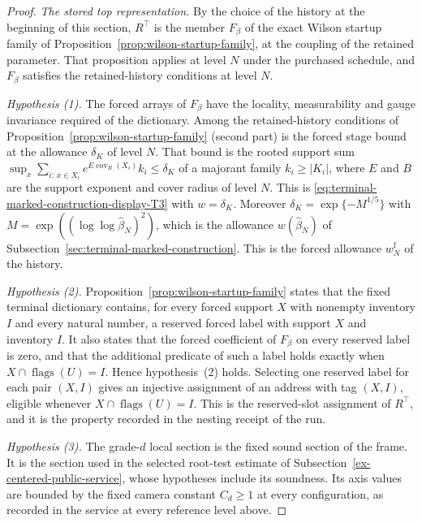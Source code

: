 \begin{proof}
\emph{The stored top representation.} By the choice of the history at
the beginning of this section, $R^\top$ is the member $F_\beta$ of the
exact Wilson startup family of
Proposition~\ref{prop:wilson-startup-family}, at the coupling of the
retained parameter. That proposition applies at level $N$ under the
purchased schedule, and $F_\beta$ satisfies the retained-history
conditions at level $N$.

\emph{Hypothesis (1).} The forced arrays of $F_\beta$ have the locality,
measurability and gauge invariance required of the dictionary. Among the
retained-history conditions of Proposition~\ref{prop:wilson-startup-family}
(second part) is the forced stage bound at the allowance $\delta_K$ of
level $N$. That bound is the rooted support sum
$\sup_x\sum_{i:\,x\in X_i}e^{E\operatorname{cov}_B(X_i)}k_i\le\delta_K$
of a majorant family $k_i\ge|K_i|$, where $E$ and $B$ are the support
exponent and cover radius of level $N$. This is \eqref{eq:terminal-marked-construction-display-T3} with $w=\delta_K$.
Moreover $\delta_K=\exp\{-M^{1/5}\}$ with
$M=\exp((\log\log\widehat\beta_N)^2)$, which is the allowance
$w(\widehat\beta_N)$ of Subsection~\ref{sec:terminal-marked-construction}.
This is the forced allowance $w^{\mathrm f}_N$ of the history.

\emph{Hypothesis (2).} Proposition~\ref{prop:wilson-startup-family}
states that the fixed terminal dictionary contains, for every forced
support $X$ with nonempty inventory $I$ and every natural number, a
reserved forced label with support $X$ and inventory $I$. It also states
that the forced coefficient of $F_\beta$ on every reserved label is
zero, and that the additional predicate of such a label holds exactly
when $X\cap\operatorname{flags}(U)=I$. Hence hypothesis~(2) holds. Selecting one reserved label for each pair $(X,I)$ gives an
injective assignment of an address with tag $(X,I)$, eligible whenever
$X\cap\operatorname{flags}(U)=I$. This is the reserved-slot assignment of $R^\top$, and it
is the property recorded in the nesting receipt of the run.

\emph{Hypothesis (3).} The grade-$d$ local section is the fixed sound
section of the frame. It is the section used in the selected root-test
estimate of Subsection~\ref{ex-centered-public-service}, whose hypotheses
include its soundness. Its axis values are bounded by the fixed camera
constant $C_d\ge1$ at every configuration, as recorded in the service at
every reference level above.


\end{proof}
